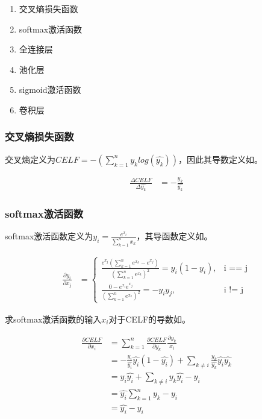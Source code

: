\begin{enumerate}
\item 交叉熵损失函数
\item softmax激活函数
\item 全连接层
\item 池化层
\item sigmoid激活函数
\item 卷积层
\end{enumerate}

\subsubsection{交叉熵损失函数}

交叉熵定义为$CELF=-(\sum_{k=1}^{n}y_klog(\hat{y_k}))$，因此其导数定义如。

\begin{equation}\label{eq:CELF}
\begin{aligned}
\frac{\Delta CELF}{\Delta \hat{y_k}} &= -\frac{y_k}{\hat{y_k}}
\end{aligned}
\end{equation}

\subsubsection{softmax激活函数}

softmax激活函数定义为$y_i = \frac{e^{x_i}}{\sum_{k=1}^{n}{x_k}}$，其导函数定义如。

\begin{equation}\label{eq:softmax-bp}
\begin{aligned}
\frac{\partial y_i}{\partial x_j} &=
\begin{cases}
\frac{e^{x_j}(\sum_{k=1}^{n}{e^{x_k}} - e^{x_j})}{(\sum_{k=1}^{n}{e^{x_k}})^2} = y_i(1-y_i), & \text{i == j} \\
\frac{0-e^{x_i}e^{x_j}}{(\sum_{k=1}^{n}{e^{x_k}})^2} = -y_iy_j, & \text{i != j}
\end{cases}
\end{aligned}
\end{equation}

求softmax激活函数的输入$x_i$对于CELF的导数如。

\begin{equation}\label{eq:CELF-softmax}
\begin{aligned}
\frac{\partial CELF}{\partial x_i} &= \sum_{k=1}^{n}{\frac{\partial CELF}{\partial y_k} \frac{\partial y_k}{x_i}} \\
&=  -\frac{y_i}{\hat{y_i}}\hat{y_i}(1-\hat{y_i}) + \sum_{k \neq i}\frac{y_k}{\hat{y_k}} {\hat{y_i}\hat{y_k}} \\
&= y_i\hat{y_i} + \sum_{k \neq i}{y_k\hat{y_i}} - y_i \\
&= \hat{y_i}\sum_{k=1}^{n}{y_k} - y_i \\
&= \hat{y_i} - y_i
\end{aligned}
\end{equation}

